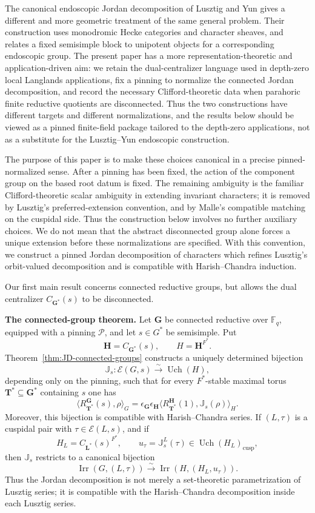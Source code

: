 \documentclass{amsart}
\theoremstyle{plain}
\numberwithin{equation}{section}
\theoremstyle{definition}
\newcommand{\cP}{\mathcal{P}}
\newcommand{\cE}{\mathcal{E}}
\newcommand{\Irr}{\operatorname{Irr}}
\newcommand{\Uch}{\operatorname{Uch}}
\newcommand{\J}{\mathbb{J}}
\newcommand{\cusp}{\operatorname{cusp}}
\newcommand{\bG}{\mathbf{G}}
\newcommand{\bL}{\mathbf{L}}
\newcommand{\bT}{\mathbf{T}}
\newcommand{\bH}{\mathbf{H}}
\newcommand{\F}{\mathbb{F}}
\begin{document}
The canonical endoscopic Jordan decomposition of Lusztig and Yun
\cite{LusztigYun2020,LusztigYunCorrigendum2021} gives a different and more
geometric treatment of the same general problem.  Their construction uses
monodromic Hecke categories and character sheaves, and relates a fixed
semisimple block to unipotent objects for a corresponding endoscopic group.  The
present paper has a more representation-theoretic and application-driven aim:
we retain the dual-centralizer language used in depth-zero local Langlands
applications, fix a pinning to normalize the connected Jordan decomposition,
and record the necessary Clifford-theoretic data when parahoric finite
reductive quotients are disconnected.  Thus the two constructions have
different targets and different normalizations, and the results below should be
viewed as a pinned finite-field package tailored to the depth-zero applications,
not as a substitute for the Lusztig--Yun endoscopic construction.

The purpose of this paper is to make these choices canonical in a precise
pinned-normalized sense.  After a pinning has been fixed, the action of the
component group on the based root datum is fixed.  The remaining ambiguity is
the familiar Clifford-theoretic scalar ambiguity in extending invariant
characters; it is removed by Lusztig's preferred-extension convention, and by
Malle's compatible matching on the cuspidal side.  Thus the construction below
involves no further auxiliary choices.  We do not mean that the abstract
disconnected group alone forces a unique extension before these normalizations
are specified.  With this convention, we construct a pinned Jordan decomposition
of characters which refines Lusztig's orbit-valued decomposition and is
compatible with Harish--Chandra induction.

Our first main result concerns connected reductive groups, but allows the
dual centralizer \(C_{\bG^*}(s)\) to be disconnected.

\medskip
\noindent
\textbf{The connected-group theorem.}
Let \(\bG\) be connected reductive over \(\F_q\), equipped with a pinning
\(\cP\), and let \(s\in G^*\) be semisimple.  Put
\[
\bH=C_{\bG^*}(s),\qquad H=\bH^{F^*}.
\]
Theorem~\ref{thm:JD-connected-groups} constructs a uniquely determined
bijection
\[
\J_s:\cE(G,s)\xrightarrow{\sim}\Uch(H),
\]
depending only on the pinning, such that for every \(F^*\)-stable maximal torus
\(\bT^*\subseteq \bG^*\) containing \(s\) one has
\[
\bigl\langle R_{\bT^*}^{\bG}(s),\rho\bigr\rangle_G
=
\epsilon_{\bG}\epsilon_{\bH}
\bigl\langle R_{\bT^*}^{\bH}(1),\J_s(\rho)\bigr\rangle_H.
\]
Moreover, this bijection is compatible with Harish--Chandra series.  If
\((L,\tau)\) is a cuspidal pair with \(\tau\in\cE(L,s)\), and if
\[
H_L=C_{\bL^*}(s)^{F^*},
\qquad
u_\tau=\J_s^L(\tau)\in\Uch(H_L)_{\cusp},
\]
then \(\J_s\) restricts to a canonical bijection
\[
\Irr(G,(L,\tau))
\xrightarrow{\sim}
\Irr(H,(H_L,u_\tau)).
\]
Thus the Jordan decomposition is not merely a set-theoretic parametrization of
Lusztig series; it is compatible with the Harish--Chandra decomposition inside
each Lusztig series.
\end{document}
